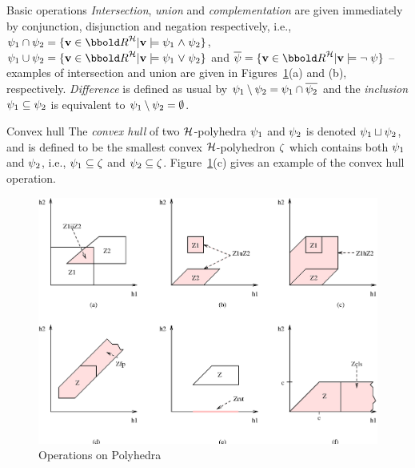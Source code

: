 {\begin{paragraph}{Basic operations}
\emph{Intersection}, \emph{union} and \emph{complementation} are given
immediately by conjunction, disjunction and negation respectively, i.e.,
$\clkcond_1 \cap \clkcond_2 = \{\clkvl \in \clkvls | \clkvl
\models \clkcond_1 \land \clkcond_2\}$,
$\clkcond_1 \cup \clkcond_2 = \{\clkvl \in \clkvls | \clkvl \models
\clkcond_1 \lor \clkcond_2\}$ and $\overline{\clkcond} = \{\clkvl \in \clkvls
| \clkvl \models \lnot \clkcond\}$ -- examples of intersection and union
are given in Figures~\ref{fig:polyops}(a) and (b), respectively.
\emph{Difference} is defined
as usual by ${\psi}_1 \setminus {\psi}_2 = {\psi}_1 \cap
\overline{{\psi}_2}$ and the \emph{inclusion}  
${\psi}_1 \subseteq {\psi}_2$ is equivalent to ${\psi}_1
\setminus {\psi}_2 = \emptyset$. 
\end{paragraph}

\begin{paragraph}{Convex hull}
The \emph{convex hull} of two $\clocks$-polyhedra ${\psi}_1$
and ${\psi}_2$ is denoted ${\psi}_1 \sqcup {\psi}_2$, and is 
defined to be the smallest convex $\clocks$-polyhedron ${\zeta}$ which
contains both ${\psi}_1$ and ${\psi}_2$, i.e.,
${\psi}_1 \subseteq {\zeta}$ and ${\psi}_2 \subseteq {\zeta}$.
Figure~\ref{fig:polyops}(c) gives an example of the convex hull operation. 
\end{paragraph}

\begin{figure}
\begin{center}
\includegraphics[width=\linewidth]{METHODS/polyops.eps}
\end{center}
\caption{Operations on Polyhedra\label{fig:polyops}}
\end{figure}

}
